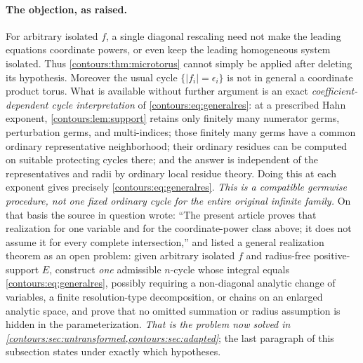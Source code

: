 \documentclass[11pt,letterpaper]{article}
\theoremstyle{definition}
\theoremstyle{remark}
\numberwithin{equation}{section}
\begin{document}
\paragraph{The objection, as raised.} For arbitrary isolated $f$, a single diagonal
rescaling need not make the leading equations coordinate powers, or even keep the
leading homogeneous system isolated. Thus \cref{contours:thm:microtorus} cannot
simply be applied after deleting its hypothesis. Moreover the usual cycle
$\{|f_i|=\epsilon_i\}$ is not in general a coordinate product torus. What is
available without further argument is an exact \emph{coefficient-dependent cycle
interpretation} of \eqref{contours:eq:generalres}: at a prescribed Hahn exponent,
\cref{contours:lem:support} retains only finitely many numerator germs, perturbation
germs, and multi-indices; those finitely many germs have a common ordinary
representative neighborhood; their ordinary residues can be computed on suitable
protecting cycles there; and the answer is independent of the representatives and
radii by ordinary local residue theory. Doing this at each exponent gives precisely
\eqref{contours:eq:generalres}. \emph{This is a compatible germwise procedure, not
one fixed ordinary cycle for the entire original infinite family.} On that basis the
source in question wrote: ``The present article proves that realization for one
variable and for the coordinate-power class above; it does not assume it for every
complete intersection,'' and listed a general realization theorem as an open
problem: given arbitrary isolated $f$ and radius-free positive-support $E$,
construct \emph{one} admissible $n$-cycle whose integral equals
\eqref{contours:eq:generalres}, possibly requiring a non-diagonal analytic change of
variables, a finite resolution-type decomposition, or chains on an enlarged analytic
space, and prove that no omitted summation or radius assumption is hidden in the
parameterization. \emph{That is the problem now solved in
\cref{contours:sec:untransformed,contours:sec:adapted}}; the last paragraph of
this subsection states under exactly which hypotheses.
\end{document}
